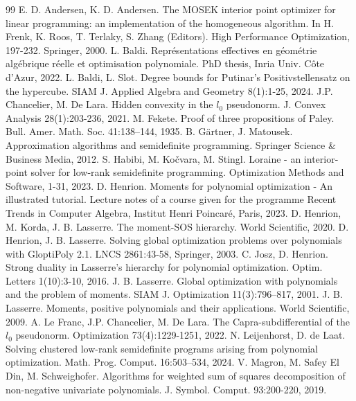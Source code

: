 \documentclass[a4paper,12pt]{article}
\begin{document}
 
\begin{thebibliography}{99}
{
E. D. Andersen, K. D. Andersen. 
The MOSEK interior point optimizer for linear programming: an implementation of the homogeneous algorithm. 
In H. Frenk, K. Roos, T. Terlaky, S. Zhang (Editors). High Performance Optimization, 197-232. Springer, 2000.}
L. Baldi. Repr\'esentations effectives en g\'eom\'etrie alg\'ebrique r\'eelle
et optimisation polynomiale. PhD thesis, Inria Univ. C\^ote d'Azur, 2022.
L. Baldi, L. Slot.
Degree bounds for Putinar's Positivstellensatz on the hypercube. SIAM J. Applied Algebra and Geometry 8(1):1-25, 2024.
J.P. Chancelier, M. De Lara.
Hidden convexity in the $l_0$ pseudonorm.
J. Convex Analysis
28(1):203-236, 2021.
M. Fekete. 
Proof of three propositions of Paley. 
Bull. Amer. Math. Soc. 41:138–144, 1935.
B. G{\"a}rtner, J. Matousek. Approximation algorithms and semidefinite programming. Springer Science \& Business Media, 2012.	
S. Habibi, M. Ko{\v{c}}vara, M. Stingl. 
Loraine - an interior-point solver for low-rank semidefinite programming. 
Optimization Methods and Software, 1-31, 2023.
D. Henrion. Moments for polynomial optimization - An illustrated tutorial. Lecture notes of a course given for the programme Recent Trends in Computer Algebra, Institut Henri Poincar\'e, Paris, 2023.
D. Henrion, M. Korda, J. B. Lasserre.
The moment-SOS hierarchy.
World Scientific, 2020.
D. Henrion, J. B. Lasserre. Solving global optimization problems over polynomials with GloptiPoly 2.1. LNCS 2861:43-58, Springer, 2003.
C. Josz, D. Henrion. Strong duality in Lasserre's hierarchy for polynomial optimization. Optim. Letters 1(10):3-10, 2016.
J. B. Lasserre.
Global optimization with polynomials and the problem of moments. SIAM J. Optimization 11(3):796--817, 2001.
J. B. Lasserre. 
Moments, positive polynomials and their applications. World Scientific, 2009. 
A. Le Franc, J.P. Chancelier, M. De Lara.
The Capra-subdifferential of the $l_0$ pseudonorm.
Optimization 73(4):1229-1251, 2022.
N. Leijenhorst, D. de Laat. Solving clustered low-rank semidefinite programs arising from polynomial optimization. {Math. Prog. Comput. 16:503–534, 2024.}
V. Magron, M. Safey El Din, M. Schweighofer. Algorithms for weighted sum of squares decomposition of non-negative univariate polynomials. J. Symbol. Comput. 93:200-220, 2019. 

\end{thebibliography}
\end{document}
